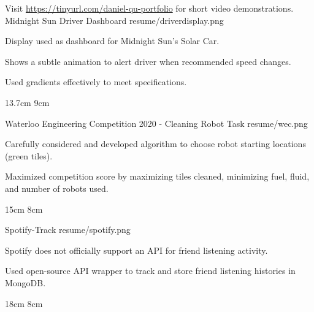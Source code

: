 

\begin{cventries}

  Visit \href{https://docs.google.com/document/d/e/2PACX-1vS0EqgEdK7blzAP3eqhoXZXuYXNIMIreo-fD56--8hDs616NmmvpaythZmCKw7Pt4CDEAfRSdoIxmMB/pub}{https://tinyurl.com/daniel-qu-portfolio} for short video demonstrations.
  \\%
  \portfolioEntry
    {Midnight Sun Driver Dashboard} %
    {resume/driverdisplay.png} %
    {
      \begin{cvitems} %
        \item {Display used as dashboard for Midnight Sun's Solar Car.}
        \item {Shows a subtle animation to alert driver when recommended speed changes.}
        \item {Used gradients effectively to meet specifications.}
      \end{cvitems}
    }
    {13.7cm}
    {9cm}

  \portfolioEntry
    {Waterloo Engineering Competition 2020 - Cleaning Robot Task} %
    {resume/wec.png} %
    {
      \begin{cvitems} %
        \item {Carefully considered and developed algorithm to choose robot starting locations (green tiles).}
        \item {Maximized competition score by maximizing tiles cleaned, minimizing fuel, fluid, and number of robots used.}
      \end{cvitems}
    }
    {15cm}
    {8cm}
  
  \newpage

  \portfolioEntry
    {Spotify-Track} %
    {resume/spotify.png} %
    {
      \begin{cvitems} %
        \item {Spotify does not officially support an API for friend listening activity.}
        \item {Used open-source API wrapper to track and store friend listening histories in MongoDB.}
      \end{cvitems}
    }
    {18cm}
    {8cm}


\end{cventries}
